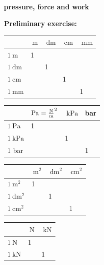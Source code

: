 \documentclass[a4paper]{article}
\begin{document}
	{\bf pressure, force and work}
	
	
	{\bf Preliminary exercise: }
	
	\renewcommand{\arraystretch}{1.5}
	\begin{tabular}{|p{1.4 cm}|p{1.4 cm}|p{1.4 cm}|p{1.4 cm}|p{1.4 cm}|}
		\hline
		& $\SI{}{\meter}$ & $\SI{}{\deci\meter}$ & $\SI{}{\centi\meter}$ & $\SI{}{\milli\meter}$ \\
		\hline
		$\SI{1}{\meter}$ & 1 & & &\\
		\hline
		$\SI{1}{\deci\meter}$ & & 1 & &\\
		\hline
		$\SI{1}{\centi\meter}$ & & & 1 &\\
		\hline
		$\SI{1}{\milli\meter}$ & & & & 1\\
		\hline
		
	\end{tabular}
	\hspace{0.5 cm}
	\begin{tabular}{|p{1.4 cm}|p{1.4 cm}|p{1.4 cm}|p{1.4 cm}|}
		\hline
		& $\SI{}{\pascal}=\SI{}{\newton\over\meter^2}$ & $\SI{}{\kilo\pascal}$ & bar\\
		\hline
		$\SI{1}{\pascal}$ & 1 & & \\
		\hline
		$\SI{1}{\kilo\pascal}$ & & 1 & \\
		\hline
		1 bar & & & 1 \\
		\hline
	\end{tabular}
	
	\vspace{0.5 cm}
	\begin{tabular}{|p{1.8 cm}|p{1.8 cm}|p{1.8 cm}|p{1.8 cm}|}
		\hline
		& $\SI{}{\meter^2}$ & $\SI{}{\deci\meter^2}$ & $\SI{}{\centi\meter^2}$ \\
		\hline
		$\SI{1}{\meter^2}$ & 1 & & \\
		\hline
		$\SI{1}{\deci\meter^2}$ & & 1 & \\
		\hline
		$\SI{1}{\centi\meter^2}$ & & & 1\\
		\hline
	\end{tabular}
	\hspace{0.5 cm}
	\begin{tabular}{|p{1.8 cm}|p{1.8 cm}|p{1.8 cm}|}
		\hline
		&$\SI{}{\newton}$ & $\SI{}{\kilo\newton}$ \\
		\hline
		$\SI{1}{\newton}$ & 1 & \\
		\hline
		$\SI{1}{\kilo\newton}$ & & 1 \\
		\hline
	\end{tabular}
	
\end{document}
